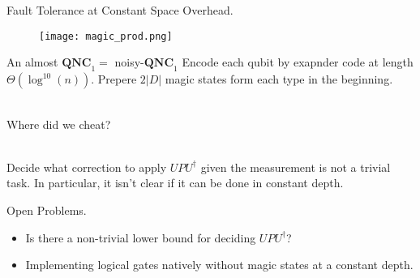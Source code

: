 \documentclass{beamer}
\newcommand*{\QNCon}{ \mathbf{QNC}_{1} }
\newcommand*{\noiseQNCon}{ noisy-$\QNCon$ }
\begin{document}
\begin{frame}{Fault Tolerance at Constant Space Overhead.}
\begin{figure}[h]
    \centering
    \texttt{[image: magic\_prod.png]}
    \label{fig:your-label}
\end{figure}
\end{frame}

\begin{frame}{An almost $\QNCon =$ \noiseQNCon}
  Encode each qubit by exapnder code at length $\Theta(\log^{10}(n))$. Prepere $2|D|$ magic states form each type in the beginning. \\~\ 

Where did we cheat? \\~\

Decide what correction to apply $UPU^{\dagger}$ given the measurement is not a trivial task. In particular, it isn't clear if it can be done in constant depth.
\end{frame}


\begin{frame}{Open Problems.}
  \begin{itemize}
    \item Is there a non-trivial lower bound for deciding $UPU^{\dagger}$?
    \item Implementing logical gates natively without magic states at a constant depth.
  \end{itemize}
\end{frame}
\end{document}
